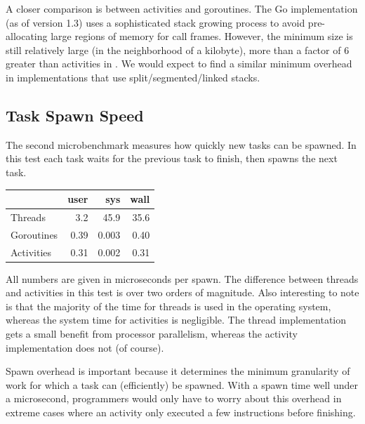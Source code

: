 \documentclass[9pt,preprint]{sigplanconf-2}
\begin{document}
A closer comparison is between activities and goroutines.
The Go implementation (as of version 1.3) uses a sophisticated stack growing process to avoid pre-allocating large regions of memory for call frames.
However, the minimum size is still relatively large (in the neighborhood of a kilobyte), more than a factor of 6 greater than activities in \charcoal{}.
We would expect to find a similar minimum overhead in implementations that use split/segmented/linked stacks.


\subsection{Task Spawn Speed}


The second microbenchmark measures how quickly new tasks can be spawned.
In this test each task waits for the previous task to finish, then spawns the next task.

\vspace{1em}
\begin{tabular}{|l|r|r|r|}
  \hline
   & user & sys & wall \\
  \hline
  \hline
  Threads & 3.2 & 45.9 & 35.6 \\
  \hline
  Goroutines & 0.39 & 0.003 & 0.40 \\
  \hline
  Activities & 0.31 & 0.002 & 0.31 \\
  \hline
\end{tabular}
\vspace{1em}

All numbers are given in microseconds per spawn.
The difference between threads and activities in this test is over two orders of magnitude.
Also interesting to note is that the majority of the time for threads is used in the operating system, whereas the system time for activities is negligible.
The thread implementation gets a small benefit from processor parallelism, whereas the activity implementation does not (of course).

Spawn overhead is important because it determines the minimum granularity of work for which a task can (efficiently) be spawned.
With a spawn time well under a microsecond, programmers would only have to worry about this overhead in extreme cases where an activity only executed a few instructions before finishing.
\end{document}
